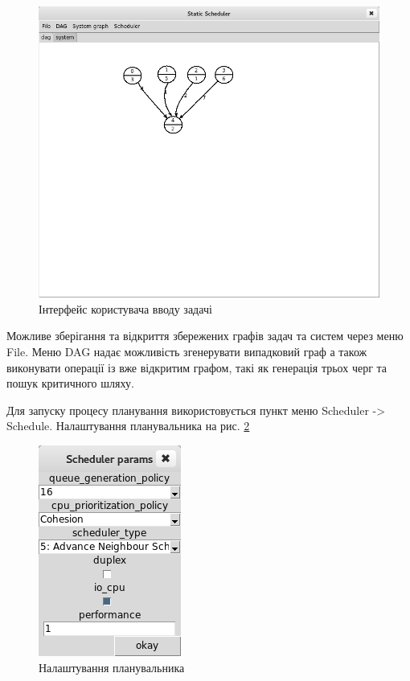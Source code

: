     \begin{figure}[h!]
      \begin{center}
        \includegraphics[width=\textwidth]{res/gui_graph_new.png}
      \end{center}
      \caption{Інтерфейс користувача вводу задачі}
    \label{fig:gui_graph_2}
    \end{figure}

Можливе зберігання та відкриття збережених графів задач та систем через меню File. Меню DAG надає можливість згенерувати випадковий граф а також виконувати операції із вже відкритим графом, такі як генерація трьох черг та пошук критичного шляху.

Для запуску процесу планування використовується пункт меню Scheduler -> Schedule.
Налаштування планувальника на рис. \ref{fig:sched_params}

    \begin{figure}[h!]
      \begin{center}
        \includegraphics{res/sched_params.png}
      \end{center}
      \caption{Налаштування планувальника}
    \label{fig:sched_params}
    \end{figure}

